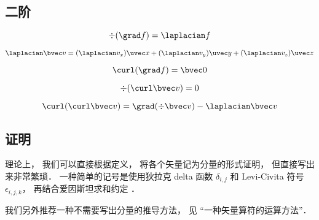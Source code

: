 \subsection{二阶}

\begin{equation}
\div (\grad f) = \laplacian f
\end{equation}

\begin{equation}
\laplacian \bvec v = (\laplacian v_x) \uvec x + (\laplacian v_y) \uvec y + (\laplacian v_z)\uvec z
\end{equation}

\begin{equation}
\curl (\grad f) = \bvec 0
\end{equation}

\begin{equation}
\div (\curl \bvec v) = 0
\end{equation}

\begin{equation}
\curl(\curl \bvec v) = \grad(\div\bvec v) - \laplacian \bvec v
\end{equation}

\subsection{证明}
理论上， 我们可以直接根据定义， 将各个矢量记为分量的形式证明， 但直接写出来非常繁琐． 一种简单的记号是使用狄拉克 delta 函数 $\delta_{i,j}$ 和 Levi-Civita 符号 $\epsilon_{i,j,k}$， 再结合爱因斯坦求和约定%
．

我们另外推荐一种不需要写出分量的推导方法， 见 “一种矢量算符的运算方法”．
